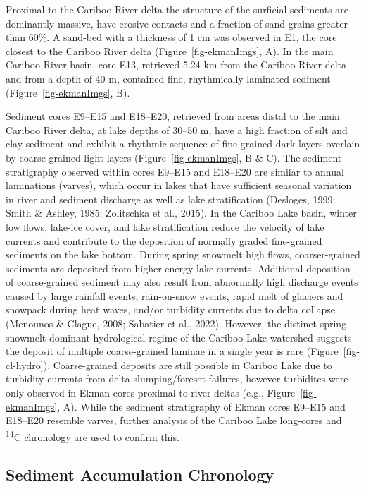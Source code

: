 \documentclass[
  letterpaper,
  DIV=11,
  numbers=noendperiod]{scrartcl}
\begin{document}
Proximal to the Cariboo River delta the structure of the surficial
sediments are dominantly massive, have erosive contacts and a fraction
of sand grains greater than 60\%. A sand-bed with a thickness of 1 cm
was observed in E1, the core closest to the Cariboo River delta
(Figure~\ref{fig-ekmanImgs}, A). In the main Cariboo River basin, core
E13, retrieved 5.24 km from the Cariboo River delta and from a depth of
40 m, contained fine, rhythmically laminated sediment
(Figure~\ref{fig-ekmanImgs}, B).

Sediment cores E9--E15 and E18--E20, retrieved from areas distal to the
main Cariboo River delta, at lake depths of 30--50 m, have a high
fraction of silt and clay sediment and exhibit a rhythmic sequence of
fine-grained dark layers overlain by coarse-grained light layers
(Figure~\ref{fig-ekmanImgs}, B \& C). The sediment stratigraphy observed
within cores E9--E15 and E18--E20 are similar to annual laminations
(varves), which occur in lakes that have sufficient seasonal variation
in river and sediment discharge as well as lake stratification
(Desloges, 1999; Smith \& Ashley, 1985; Zolitschka et al., 2015). In the
Cariboo Lake basin, winter low flows, lake-ice cover, and lake
stratification reduce the velocity of lake currents and contribute to
the deposition of normally graded fine-grained sediments on the lake
bottom. During spring snowmelt high flows, coarser-grained sediments are
deposited from higher energy lake currents. Additional deposition of
coarse-grained sediment may also result from abnormally high discharge
events caused by large rainfall events, rain-on-snow events, rapid melt
of glaciers and snowpack during heat waves, and/or turbidity currents
due to delta collapse (Menounos \& Clague, 2008; Sabatier et al., 2022).
However, the distinct spring snowmelt-dominant hydrological regime of
the Cariboo Lake watershed suggests the deposit of multiple
coarse-grained laminae in a single year is rare
(Figure~\ref{fig-cl-hydro}). Coarse-grained deposits are still possible
in Cariboo Lake due to turbidity currents from delta slumping/foreset
failures, however turbidites were only observed in Ekman cores proximal
to river deltas (e.g., Figure~\ref{fig-ekmanImgs}, A). While the
sediment stratigraphy of Ekman cores E9--E15 and E18--E20 resemble
varves, further analysis of the Cariboo Lake long-cores and
\textsuperscript{14}C chronology are used to confirm this.

\hypertarget{sediment-accumulation-chronology}{%
\subsection{Sediment Accumulation
Chronology}\label{sediment-accumulation-chronology}}
\end{document}
